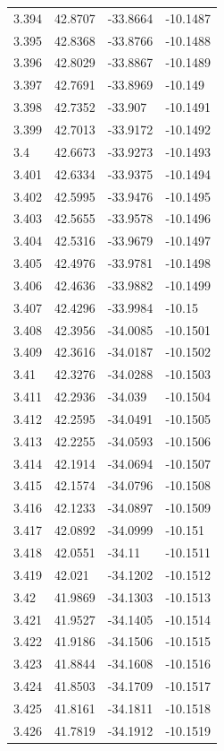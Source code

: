 \begin{tabular}{llll}
3.394 & 42.8707 & -33.8664 & -10.1487 \\
3.395 & 42.8368 & -33.8766 & -10.1488 \\
3.396 & 42.8029 & -33.8867 & -10.1489 \\
3.397 & 42.7691 & -33.8969 & -10.149 \\
3.398 & 42.7352 & -33.907 & -10.1491 \\
3.399 & 42.7013 & -33.9172 & -10.1492 \\
3.4 & 42.6673 & -33.9273 & -10.1493 \\
3.401 & 42.6334 & -33.9375 & -10.1494 \\
3.402 & 42.5995 & -33.9476 & -10.1495 \\
3.403 & 42.5655 & -33.9578 & -10.1496 \\
3.404 & 42.5316 & -33.9679 & -10.1497 \\
3.405 & 42.4976 & -33.9781 & -10.1498 \\
3.406 & 42.4636 & -33.9882 & -10.1499 \\
3.407 & 42.4296 & -33.9984 & -10.15 \\
3.408 & 42.3956 & -34.0085 & -10.1501 \\
3.409 & 42.3616 & -34.0187 & -10.1502 \\
3.41 & 42.3276 & -34.0288 & -10.1503 \\
3.411 & 42.2936 & -34.039 & -10.1504 \\
3.412 & 42.2595 & -34.0491 & -10.1505 \\
3.413 & 42.2255 & -34.0593 & -10.1506 \\
3.414 & 42.1914 & -34.0694 & -10.1507 \\
3.415 & 42.1574 & -34.0796 & -10.1508 \\
3.416 & 42.1233 & -34.0897 & -10.1509 \\
3.417 & 42.0892 & -34.0999 & -10.151 \\
3.418 & 42.0551 & -34.11 & -10.1511 \\
3.419 & 42.021 & -34.1202 & -10.1512 \\
3.42 & 41.9869 & -34.1303 & -10.1513 \\
3.421 & 41.9527 & -34.1405 & -10.1514 \\
3.422 & 41.9186 & -34.1506 & -10.1515 \\
3.423 & 41.8844 & -34.1608 & -10.1516 \\
3.424 & 41.8503 & -34.1709 & -10.1517 \\
3.425 & 41.8161 & -34.1811 & -10.1518 \\
3.426 & 41.7819 & -34.1912 & -10.1519 \\

\end{tabular}
